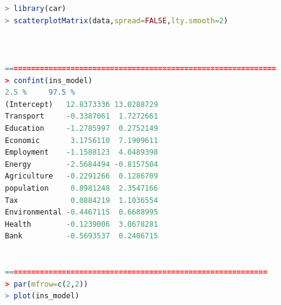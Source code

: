 \documentclass{apmcmthesis}
\begin{document}
\begin{lstlisting}[language=r]
> library(car)
> scatterplotMatrix(data,spread=FALSE,lty.smooth=2)



==============================================================
> confint(ins_model)
2.5 %     97.5 %
(Intercept)   12.8373336 13.0288729
Transport     -0.3387061  1.7272661
Education     -1.2785997  0.2752149
Economic       3.1756110  7.1909611
Employment    -1.1588123  4.0489398
Energy        -2.5684494 -0.8157504
Agriculture   -0.2291266  0.1286709
population     0.8981248  2.3547166
Tax            0.0884219  1.1036554
Environmental -0.4467115  0.6688995
Health        -0.1239006  3.0678281
Bank          -0.5693537  0.2406715     


============================================================
> par(mfrow=c(2,2))
> plot(ins_model)

\end{lstlisting}
\end{document}
